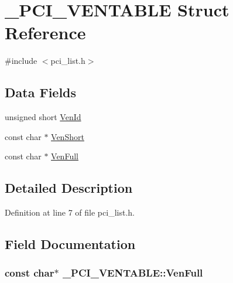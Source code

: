 \hypertarget{struct__PCI__VENTABLE}{}\section{\+\_\+\+P\+C\+I\+\_\+\+V\+E\+N\+T\+A\+B\+LE Struct Reference}
\label{struct__PCI__VENTABLE}


{\ttfamily \#include $<$pci\+\_\+list.\+h$>$}

\subsection*{Data Fields}
\begin{DoxyCompactItemize}
\item 
unsigned short \hyperlink{struct__PCI__VENTABLE_a8df580b1447df15ebe8a128b8225e710}{Ven\+Id}
\item 
const char $\ast$ \hyperlink{struct__PCI__VENTABLE_a37c44257d4237ef312626d97ef3a5fa5}{Ven\+Short}
\item 
const char $\ast$ \hyperlink{struct__PCI__VENTABLE_aad91ea393afe64b533c1ad399f12baf2}{Ven\+Full}
\end{DoxyCompactItemize}


\subsection{Detailed Description}


Definition at line 7 of file pci\+\_\+list.\+h.



\subsection{Field Documentation}
\subsubsection[{\texorpdfstring{Ven\+Full}{VenFull}}]{\setlength{\rightskip}{0pt plus 5cm}const char$\ast$ \+\_\+\+P\+C\+I\+\_\+\+V\+E\+N\+T\+A\+B\+L\+E\+::\+Ven\+Full}\hypertarget{struct__PCI__VENTABLE_aad91ea393afe64b533c1ad399f12baf2}{}\label{struct__PCI__VENTABLE_aad91ea393afe64b533c1ad399f12baf2}



